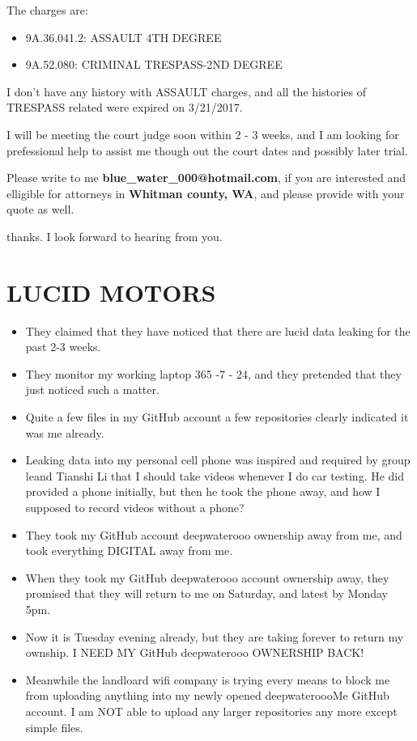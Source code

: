 \documentclass[9pt, b5paaper]{book}
\begin{document}
The charges are: 
\begin{itemize}
\item 9A.36.041.2: ASSAULT 4TH DEGREE
\item 9A.52.080: CRIMINAL TRESPASS-2ND DEGREE
\end{itemize}

I don't have any history with ASSAULT charges, and all the histories
of TRESPASS related were expired on 3/21/2017. 

I will be meeting the court judge soon within 2 - 3 weeks, and I am
looking for prefessional help to assist me though out the court dates and possibly
later trial. 

Please write to me \textbf{blue\_water\_000@hotmail.com}, if you are interested
and elligible for attorneys in \textbf{Whitman county, WA}, and please provide with your
quote as well. 

thanks. I look forward to hearing from you. 

\chapter{LUCID MOTORS}
\label{sec-5}
\begin{itemize}
\item They claimed that they have noticed that there are lucid data
leaking for the past 2-3 weeks.
\item They monitor my working laptop 365 -7 - 24, and they pretended that
they just noticed such a matter.
\item Quite a few files in my GitHub account a few repositories clearly indicated it was me already.
\item Leaking data into my personal cell phone was inspired and required
by group leand Tianshi Li that I should take videos whenever I do
car testing. He did provided a phone initially, but then he took the
phone away, and how I supposed to record videos without a phone?
\item They took my GitHub account deepwaterooo ownership away from me, and
took everything DIGITAL away from me.
\item When they took my GitHub deepwaterooo account ownership away, they
promised that they will return to me on Saturday, and latest by
Monday 5pm.
\item Now it is Tuesday evening already, but they are taking forever to return my ownship. I NEED MY
GitHub deepwaterooo OWNERSHIP BACK!
\item Meanwhile the landloard wifi company is trying every means to block
me from uploading anything into my newly opened deepwateroooMe
GitHub account. I am NOT able to upload any larger repositories any
more except simple files.
\end{itemize}
\end{document}
